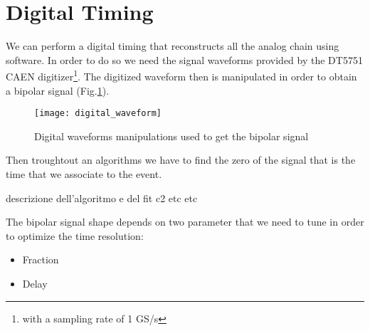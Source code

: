 \section*{Digital Timing}

We can perform a digital timing that reconstructs all the analog chain using software. In order to do so we need the signal waveforms provided by the DT5751 CAEN digitizer\footnote{with a sampling rate of 1 GS/s}.
The digitized waveform then is manipulated in order to obtain a bipolar signal (Fig.\ref{Fig: digital waveform manipulations}).
\begin{figure}[h!]
\centering
\texttt{[image: digital\_waveform]}
\caption{Digital waveforms manipulations used to get the bipolar signal}
\label{Fig: digital waveform manipulations}
\end{figure}
Then troughtout an algorithms we have to find the zero of the signal that is the time that we associate to the event.

\medskip
descrizione dell'algoritmo e del fit c2 etc etc
\medskip

\noindent The bipolar signal shape depends on two parameter that we need to tune in order to optimize the time resolution:
\begin{itemize}
\item Fraction
\item Delay
\end{itemize}


